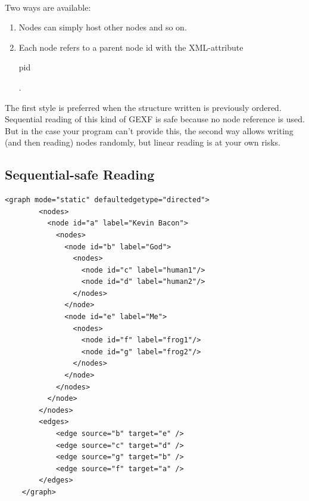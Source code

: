 \documentclass[a4paper,10pt]{article}
\begin{document}
\paragraph{}
Two ways are available:
\begin{enumerate}
 \item Nodes can simply host other nodes and so on.
 \item Each node refers to a parent node id with the XML-attribute \begin{footnotesize}pid\end{footnotesize}.
\end{enumerate}

The first style is preferred when the structure written is previously ordered. Sequential reading of this kind of GEXF is safe because no node reference is used. But in the case your program can't provide this, the second way allows writing (and then reading) nodes randomly, but linear reading is at your own risks.

\subsection{Sequential-safe Reading}

\lstset{ style=gexf }
\begin{lstlisting}[caption={First way},label=hierarchy1]
    <graph mode="static" defaultedgetype="directed">
        <nodes>
          <node id="a" label="Kevin Bacon">
            <nodes>
              <node id="b" label="God">
                <nodes>
                  <node id="c" label="human1"/>
                  <node id="d" label="human2"/>
                </nodes>
              </node>
              <node id="e" label="Me">
                <nodes>
                  <node id="f" label="frog1"/>
                  <node id="g" label="frog2"/>
                </nodes>
              </node>
            </nodes>
          </node>
        </nodes>
        <edges>
            <edge source="b" target="e" />
            <edge source="c" target="d" />
            <edge source="g" target="b" />
            <edge source="f" target="a" />
        </edges>
    </graph>
\end{lstlisting}
\end{document}
